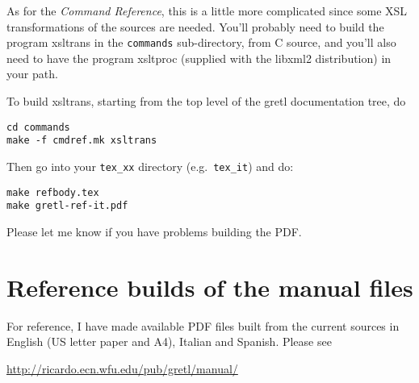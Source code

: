 \documentclass{article}
\begin{document}
As for the \textit{Command Reference}, this is a little more
complicated since some XSL transformations of the sources are needed.
You'll probably need to build the program \textsf{xsltrans} in the
\texttt{commands} sub-directory, from C source, and you'll also need
to have the program \textsf{xsltproc} (supplied with the
\textsf{libxml2} distribution) in your path.

To build \textsf{xsltrans}, starting from the top level of the
\textsf{gretl} documentation tree, do

\begin{verbatim}
cd commands
make -f cmdref.mk xsltrans
\end{verbatim}

Then go into your \texttt{tex\_xx} directory (e.g.\ \texttt{tex\_it})
and do:

\begin{verbatim}
make refbody.tex
make gretl-ref-it.pdf
\end{verbatim}

Please let me know if you have problems building the PDF.

\section{Reference builds of the manual files}

For reference, I have made available PDF files built from the current
sources in English (US letter paper and A4), Italian and Spanish.
Please see

\begin{center}
\url{http://ricardo.ecn.wfu.edu/pub/gretl/manual/} 
\end{center}
\end{document}
